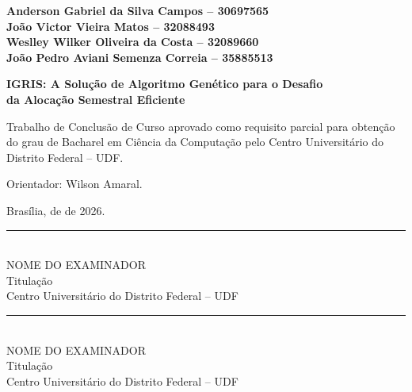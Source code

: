 ﻿%
\begin{folhadeaprovacao}
\begin{center}

{\normalsize\bfseries
  Anderson Gabriel da Silva Campos -- 30697565\\[0.2cm]
  João Victor Vieira Matos -- 32088493\\[0.2cm]
  Weslley Wilker Oliveira da Costa -- 32089660\\[0.2cm]
  João Pedro Aviani Semenza Correia -- 35885513
}

\vspace{1.5cm}

{\Large\bfseries
  IGRIS: A Solução de Algoritmo Genético para o Desafio\\
  da Alocação Semestral Eficiente
}

\vspace{1.5cm}

\hspace{.45\textwidth}
\begin{minipage}{.5\textwidth}
  \SingleSpacing
  Trabalho de Conclusão de Curso aprovado como
  requisito parcial para obtenção do grau de
  Bacharel em Ciência da Computação pelo Centro
  Universitário do Distrito Federal -- UDF.

  \vspace{0.35cm}
  Orientador: Wilson Amaral.
\end{minipage}

\vspace{1.2cm}
Brasília, \underline{\hspace{1cm}} de \underline{\hspace{3cm}} de 2026.

\vspace{1.35cm}

\begin{minipage}{8.5cm}
\centering
\rule{\linewidth}{0.4pt}\\[-0.05cm]
{\small NOME DO EXAMINADOR}\\[-0.05cm]
{\small Titulação}\\[-0.05cm]
{\small Centro Universitário do Distrito Federal -- UDF}
\end{minipage}

\vspace{1.15cm}

\begin{minipage}{8.5cm}
\centering
\rule{\linewidth}{0.4pt}\\[-0.05cm]
{\small NOME DO EXAMINADOR}\\[-0.05cm]
{\small Titulação}\\[-0.05cm]
{\small Centro Universitário do Distrito Federal -- UDF}
\end{minipage}


\end{center}
\end{folhadeaprovacao}
